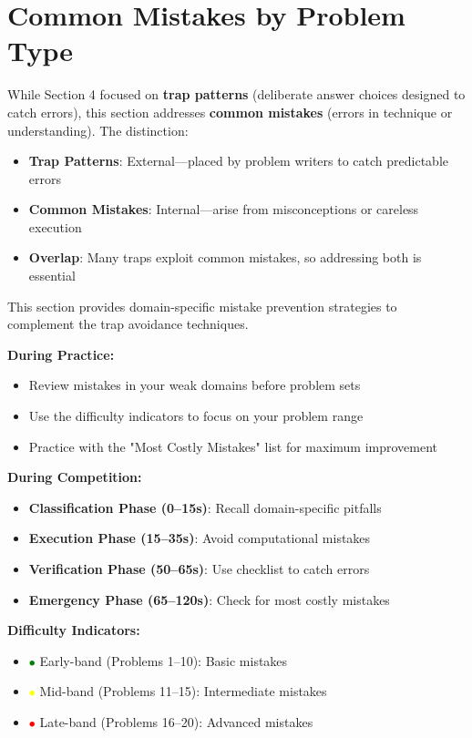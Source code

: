 \documentclass{article}
\begin{document}
\section{Common Mistakes by Problem Type}

\begin{tcolorbox}[colback=blue!5!white,colframe=blue!75!black,title={\textbf{Relationship to Trap Patterns}}]
While Section 4 focused on \textbf{trap patterns} (deliberate answer choices designed to catch errors), this section addresses \textbf{common mistakes} (errors in technique or understanding). The distinction:
\begin{itemize}[nosep]
\item \textbf{Trap Patterns}: External—placed by problem writers to catch predictable errors
\item \textbf{Common Mistakes}: Internal—arise from misconceptions or careless execution
\item \textbf{Overlap}: Many traps exploit common mistakes, so addressing both is essential
\end{itemize}
This section provides domain-specific mistake prevention strategies to complement the trap avoidance techniques.
\end{tcolorbox}

\begin{tcolorbox}[colback=yellow!10!white,colframe=orange!75!black,title={\textbf{How to Use This Section}}]
\textbf{During Practice:}
\begin{itemize}[nosep]
\item Review mistakes in your weak domains before problem sets
\item Use the difficulty indicators to focus on your problem range
\item Practice with the "Most Costly Mistakes" list for maximum improvement
\end{itemize}

\textbf{During Competition:}
\begin{itemize}[nosep]
\item \textbf{Classification Phase (0--15s)}: Recall domain-specific pitfalls
\item \textbf{Execution Phase (15--35s)}: Avoid computational mistakes
\item \textbf{Verification Phase (50--65s)}: Use checklist to catch errors
\item \textbf{Emergency Phase (65--120s)}: Check for most costly mistakes
\end{itemize}

\textbf{Difficulty Indicators:}
\begin{itemize}[nosep]
\item \textcolor{green}{$\bullet$} Early-band (Problems 1--10): Basic mistakes
\item \textcolor{yellow}{$\bullet$} Mid-band (Problems 11--15): Intermediate mistakes
\item \textcolor{red}{$\bullet$} Late-band (Problems 16--20): Advanced mistakes
\end{itemize}
\end{tcolorbox}
\end{document}
